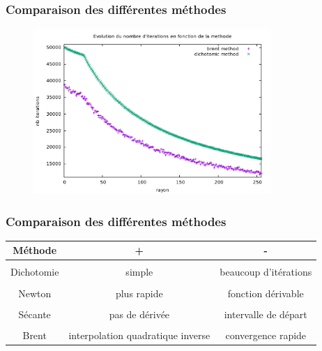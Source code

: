 \documentclass[french]{beamer}
\begin{document}
\begin{frame}
\frametitle{Comparaison des différentes méthodes}

   \begin{figure}[htb!]
      \includegraphics[width=9cm]{figures/brent_method3.pdf}
   \end{figure}
\end{frame}


\begin{frame}
\frametitle{Comparaison des différentes méthodes}

   \begin{tabular}{|c|c|c|}
     \hline
        Méthode & + & - \\
     \hline
     \\
     Dichotomie & simple & beaucoup d'itérations  
     \\  
     \hline
     \\
     Newton & plus rapide  & fonction dérivable 
     \\ 
     \hline
     \\  
     Sécante & pas de dérivée & intervalle de départ 
     \\  
     \hline  
     \\  
     Brent & interpolation quadratique inverse & convergence rapide 
     \\  
     \hline
   \end{tabular}
\end{frame}


\end{document}

